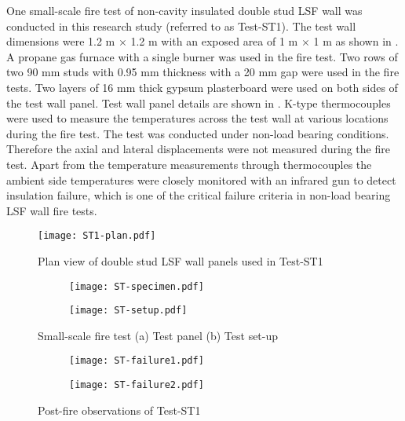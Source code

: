 One small-scale fire test of non-cavity insulated double stud LSF wall was conducted in this research study (referred to as Test-ST1). The test wall dimensions were 1.2 m \(\times\) 1.2 m with an exposed area of 1 m \(\times\) 1 m as shown in . A propane gas furnace with a single burner was used in the fire test. Two rows of two 90 mm studs with 0.95 mm thickness with a 20 mm gap were used in the fire tests. Two layers of 16 mm thick gypsum plasterboard were used on both sides of the test wall panel. Test wall panel details are shown in . K-type thermocouples were used to measure the temperatures across the test wall at various locations during the fire test. The test was conducted under non-load bearing conditions. Therefore the axial and lateral displacements were not measured during the fire test. Apart from the temperature measurements through thermocouples the ambient side temperatures were closely monitored with an infrared gun to detect insulation failure, which is one of the critical failure criteria in non-load bearing LSF wall fire tests. 
\begin{figure}[htbp]
	\centering
		\texttt{[image: ST1-plan.pdf]} 
		\caption{Plan view of double stud LSF wall panels used in Test-ST1}
		\label{fig:ST1-plan}
\end{figure}
\begin{figure}[!htbp]
	\centering
	\begin{subfigure}[b]{0.55\textwidth}
		\centering
		\texttt{[image: ST-specimen.pdf]}
		\caption{}
		\label{subfig:ST-specimen}
	\end{subfigure}
	\begin{subfigure}[b]{0.4\textwidth}
		\centering
		\texttt{[image: ST-setup.pdf]}
		\caption{}
		\label{subfig:ST-setup}
	\end{subfigure}
	   \caption{Small-scale fire test (a) Test panel (b) Test set-up}
	   \label{fig:ST-setup-typical}
\end{figure}
\begin{figure}[!htbp]
	\centering
	\begin{subfigure}[b]{0.4\textwidth}
		\centering
		\texttt{[image: ST-failure1.pdf]}
		\caption{}
		\label{subfig:ST-failure1}
	\end{subfigure}
	\begin{subfigure}[b]{0.55\textwidth}
		\centering
		\texttt{[image: ST-failure2.pdf]}
		\caption{}
		\label{subfig:ST-failure2}
	\end{subfigure}
	   \caption{Post-fire observations of Test-ST1}
	   \label{fig:ST-failure-typical}
\end{figure}

